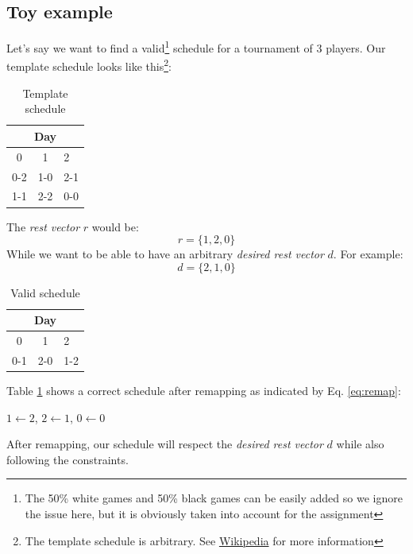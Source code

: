 \documentclass[a4paper, 10pt]{article}
\begin{document}
\subsection{Toy example}
Let's say we want to find a valid\footnote{The 50\% white games and 50\% black games can be easily added so we ignore the issue here, but it is obviously taken into account for the assignment} schedule for a tournament of 3 players. Our template schedule
looks like this\footnote{The template schedule is arbitrary. See \href{https://en.wikipedia.org/wiki/Round-robin\_tournament\#Berger\_tables}{Wikipedia} for more information}:

\begin{minipage}[t]{0.45\linewidth}
    \begin{table}[H]
	    \centering
	    \begin{tabular}{ccl}
		\multicolumn{3}{c}{Day}                                 \\ \hline
		\multicolumn{1}{c}{0}  & \multicolumn{1}{c}{1}  & 2     \\ \hline
		0-2                     & 1-0                     & 2-1 \\
		\multicolumn{1}{l}{1-1} & \multicolumn{1}{l}{2-2} & 0-0 \\
		\hline
	    \end{tabular}
	\caption{Template schedule}
    \end{table}
    The \textit{rest vector} $r$ would be:
    \begin{equation*}
	r = \{1, 2, 0\}
    \end{equation*}
    While we want to be able to have an arbitrary \textit{desired rest vector} $d$. For example:
    \begin{equation*}
	d = \{2, 1, 0\}
    \end{equation*}
\end{minipage} \hfill
\begin{minipage}[t]{0.45\linewidth}
    \begin{table}[H]
	    \centering
	    \begin{tabular}{ccl}
		\multicolumn{3}{c}{Day}                                 \\ \hline
		\multicolumn{1}{c}{0}  & \multicolumn{1}{c}{1}  & 2   \\ \hline
		0-1                     & 2-0                     & 1-2 \\
		\hline
	    \end{tabular}
	\caption{Valid schedule}
	\label{table:remap}
    \end{table}
    Table \ref{table:remap} shows a correct schedule after remapping as indicated by Eq. \ref{eq:remap}: 

    \begin{center}
    $1 \leftarrow 2$, $2 \leftarrow 1$, $0 \leftarrow 0$
    \end{center}

    After remapping, our schedule will respect the \textit{desired rest vector} $d$ while also following the constraints.

\end{minipage}
\end{document}
